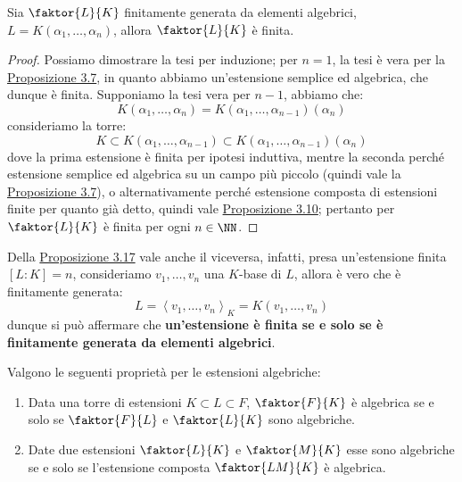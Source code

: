 \documentclass[11pt]{scrartcl}
\begin{document}
\begin{proposition}
    \label{3.17}
    Sia $\faktor{L}{K}$ finitamente generata da elementi algebrici, $L = K(\alpha_1,\ldots,\alpha_n)$, allora $\faktor{L}{K}$ è finita.
\end{proposition}

\begin{proof}
    Possiamo dimostrare la tesi per induzione; per $n = 1$, la tesi è vera per la \hyperref[3.7]{Proposizione 3.7}, in quanto abbiamo un'estensione semplice ed algebrica, che dunque è finita. Supponiamo la tesi vera per $n-1$, abbiamo che:
    \[ K(\alpha_1,\ldots,\alpha_n) = K(\alpha_1,\ldots,\alpha_{n-1})(\alpha_n)
        \]
    consideriamo la torre:
    \[ K \subset K(\alpha_1,\ldots,\alpha_{n-1}) \subset K(\alpha_1,\ldots,\alpha_{n-1})(\alpha_n)
        \]
    dove la prima estensione è finita per ipotesi induttiva, mentre la seconda perché estensione semplice ed algebrica su un campo più piccolo (quindi vale la \hyperref[3.7]{Proposizione 3.7}), o alternativamente perché estensione composta di estensioni finite per quanto già detto, 
    quindi vale \hyperref[3.10]{Proposizione 3.10}; pertanto per $\faktor{L}{K}$ è finita per ogni $n \in \NN$.
\end{proof}

\pagebreak
\begin{remark}
    \label{3.18}
    Della \hyperref[3.17]{Proposizione 3.17} vale anche il viceversa, infatti, presa un'estensione finita $[L:K] = n$, consideriamo $v_1,\ldots,v_n$ una $K$-base di $L$, allora 
    è vero che è finitamente generata:
    \[ L = \left<v_1,\ldots,v_n\right>_K = K(v_1,\ldots,v_n)
        \]
    dunque si può affermare che \textbf{un'estensione è finita se e solo se è finitamente generata da elementi algebrici}.
\end{remark}

\begin{proposition}
    \label{3.19}
    Valgono le seguenti proprietà per le estensioni algebriche:
    \begin{enumerate}[(1)]
        \item Data una torre di estensioni $K \subset L \subset F$, $\faktor{F}{K}$ è algebrica se e solo se $\faktor{F}{L}$ e $\faktor{L}{K}$ sono algebriche.
        \item Date due estensioni $\faktor{L}{K}$ e $\faktor{M}{K}$ esse sono algebriche se e solo se l'estensione composta $\faktor{LM}{K}$ è algebrica.
    \end{enumerate}
\end{proposition}
\end{document}
